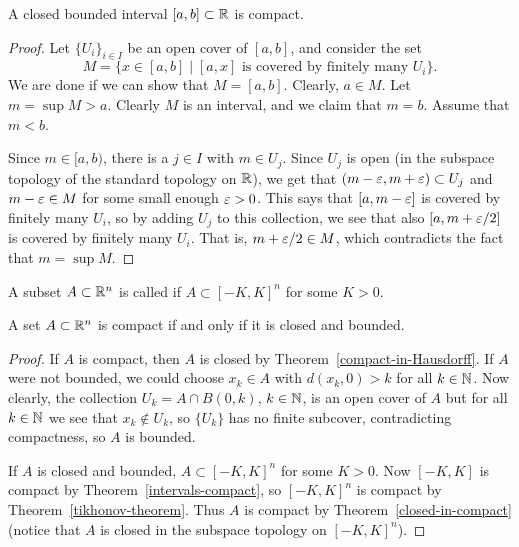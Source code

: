 \begin{thm}
  \label{intervals-compact}
  A closed bounded interval $[a,b] \subset \mathbb{R}$ is compact.
\end{thm}
\begin{proof}
  Let $\{U_i\}_{i\in I}$ be an open cover of $[a,b]$, and consider the set
  \[
    M = \{x \in [a,b] \mid \text{$[a,x]$ is covered by finitely many $U_i$}\}.
  \]
  We are done if we can show that $M = [a,b]$. Clearly, $a \in M$. Let $m = \sup M > a$. Clearly $M$ is an interval, and we claim that $m = b$. Assume that $m < b$.
  
  Since $m \in [a,b)$, there is a $j \in I$ with $m \in U_j$. Since $U_j$ is open (in the subspace topology of the standard topology on $\mathbb{R}$), we get that $(m-\varepsilon,m+\varepsilon) \subset U_j$ and $m - \varepsilon \in M$ for some small enough $\varepsilon > 0$. This says that $[a,m-\varepsilon]$ is covered by finitely many $U_i$, so by adding $U_j$ to this collection, we see that also $[a,m+\varepsilon/2]$ is covered by finitely many $U_i$. That is, $m+\varepsilon/2 \in M$, which contradicts the fact that $m = \sup M$.  
\end{proof}
\begin{defn}
  A subset $A \subset \mathbb{R}^n$ is called  if $A \subset [-K,K]^n$ for some $K > 0$.
\end{defn}
\begin{thm}
  \label{heine-borel}
  A set $A \subset \mathbb{R}^n$ is compact if and only if it is closed and bounded.
\end{thm}
\begin{proof}
  If $A$ is compact, then $A$ is closed by Theorem~\ref{compact-in-Hausdorff}. If $A$ were not bounded, we could choose $x_k \in A$ with $d(x_k,0) > k$ for all $k \in \mathbb{N}$. Now clearly, the collection $U_k = A \cap B(0,k)$, $k \in \mathbb{N}$, is an open cover of $A$ but for all $k \in \mathbb{N}$ we see that $x_k \notin U_k$, so $\{U_k\}$ has no finite subcover, contradicting compactness, so $A$ is bounded.
  
  If $A$ is closed and bounded, $A \subset [-K,K]^n$ for some $K > 0$. Now $[-K,K]$ is compact by Theorem~\ref{intervals-compact}, so $[-K,K]^n$ is compact by Theorem~\ref{tikhonov-theorem}. Thus $A$ is compact by Theorem~\ref{closed-in-compact} (notice that $A$ is closed in the subspace topology on $[-K,K]^n$).
\end{proof}
